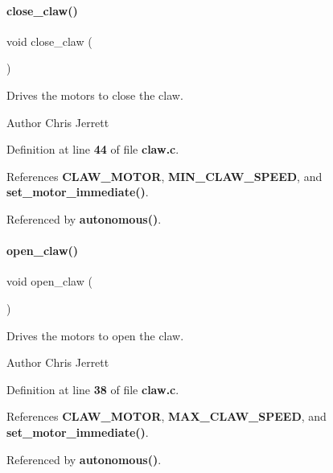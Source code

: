\paragraph{close\+\_\+claw()}
{\footnotesize\ttfamily void close\+\_\+claw (\begin{DoxyParamCaption}{ }\end{DoxyParamCaption})}



Drives the motors to close the claw. 

\begin{DoxyAuthor}{Author}
Chris Jerrett 
\end{DoxyAuthor}


Definition at line \textbf{ 44} of file \textbf{ claw.\+c}.



References \textbf{ C\+L\+A\+W\+\_\+\+M\+O\+T\+OR}, \textbf{ M\+I\+N\+\_\+\+C\+L\+A\+W\+\_\+\+S\+P\+E\+ED}, and \textbf{ set\+\_\+motor\+\_\+immediate()}.



Referenced by \textbf{ autonomous()}.

\mbox{\label{claw_8c_a03023ca28f671b9fa7bac07782ccd8c1}} 
\paragraph{open\+\_\+claw()}
{\footnotesize\ttfamily void open\+\_\+claw (\begin{DoxyParamCaption}{ }\end{DoxyParamCaption})}



Drives the motors to open the claw. 

\begin{DoxyAuthor}{Author}
Chris Jerrett 
\end{DoxyAuthor}


Definition at line \textbf{ 38} of file \textbf{ claw.\+c}.



References \textbf{ C\+L\+A\+W\+\_\+\+M\+O\+T\+OR}, \textbf{ M\+A\+X\+\_\+\+C\+L\+A\+W\+\_\+\+S\+P\+E\+ED}, and \textbf{ set\+\_\+motor\+\_\+immediate()}.



Referenced by \textbf{ autonomous()}.

\mbox{\label{claw_8c_a3a57f998b1884d39b0cc786689f7086f}} 

